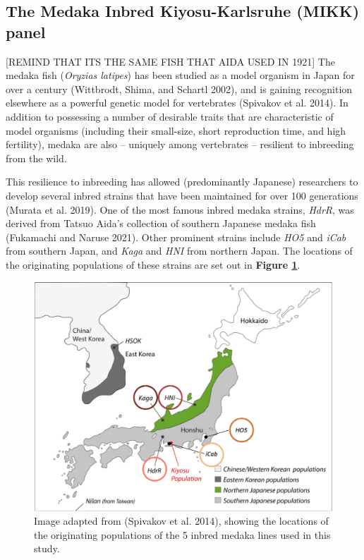 \documentclass[
]{book}
\begin{document}
\hypertarget{MIKK-background}{%
\subsection{The Medaka Inbred Kiyosu-Karlsruhe (MIKK) panel}\label{MIKK-background}}

{[}REMIND THAT ITS THE SAME FISH THAT AIDA USED IN 1921{]}
The medaka fish (\emph{Oryzias latipes}) has been studied as a model organism in Japan for over a century (Wittbrodt, Shima, and Schartl 2002), and is gaining recognition elsewhere as a powerful genetic model for vertebrates (Spivakov et al. 2014). In addition to possessing a number of desirable traits that are characteristic of model organisms (including their small-size, short reproduction time, and high fertility), medaka are also -- uniquely among vertebrates -- resilient to inbreeding from the wild.

This resilience to inbreeding has allowed (predominantly Japanese) researchers to develop several inbred strains that have been maintained for over 100 generations (Murata et al. 2019). One of the most famous inbred medaka strains, \emph{HdrR}, was derived from Tatsuo Aida's collection of southern Japanese medaka fish (Fukamachi and Naruse 2021). Other prominent strains include \emph{HO5} and \emph{iCab} from southern Japan, and \emph{Kaga} and \emph{HNI} from northern Japan. The locations of the originating populations of these strains are set out in \textbf{Figure \ref{fig:line-locations}}.



\begin{figure}
\includegraphics[width=1\linewidth]{figs/pilot/line_locations} \caption{Image adapted from (Spivakov et al. 2014), showing the locations of the originating populations of the 5 inbred medaka lines used in this study.}\label{fig:line-locations}
\end{figure}
\end{document}

